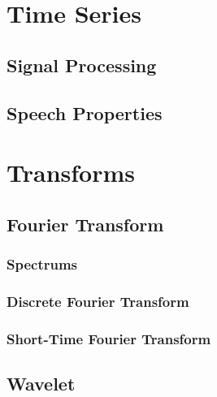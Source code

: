 \documentclass{book}
\begin{document}
\begin{appendices}
\chapter{Time Series}
  \section{Signal Processing}
  \section{Speech Properties}

\chapter{Transforms}
  \section{Fourier Transform}
    \subsection{Spectrums}
    \subsection{Discrete Fourier Transform}
    \subsection{Short-Time Fourier Transform}
  \section{Wavelet}


\end{appendices}
\end{document}
